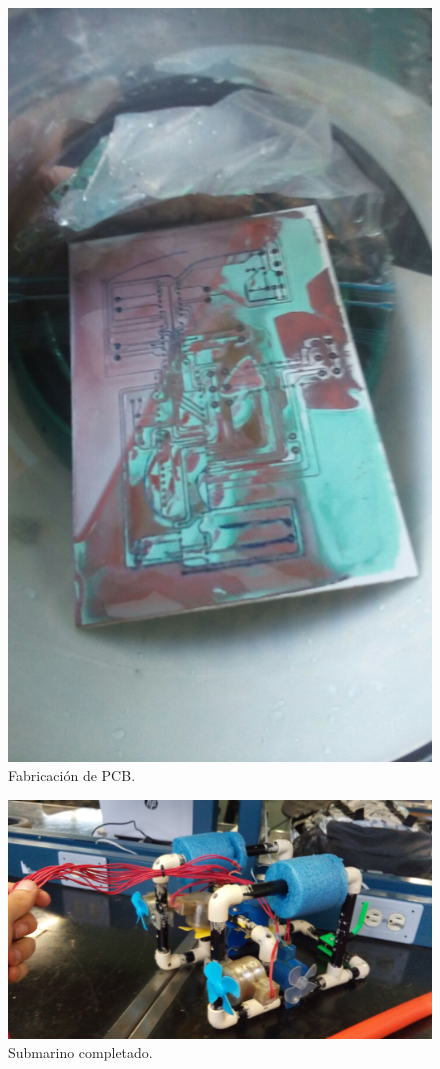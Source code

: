   \begin{figure}[!htbp]
 \centering
 \includegraphics [scale=0.2]
 {./img/IMG-20160426-WA0001.jpg}
 \caption{Fabricaci\'on de PCB.}
 \end{figure}

  \begin{figure}[!htbp]
 \centering
 \includegraphics [scale=0.1]
 {./img/20160428_180525.jpg}
 \caption{Submarino completado.}
 \end{figure}

